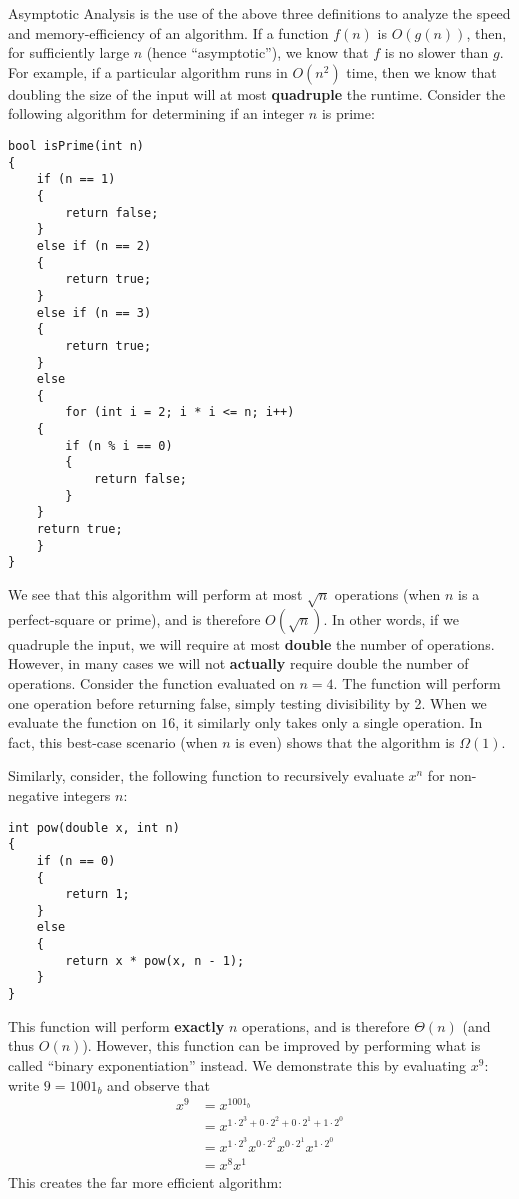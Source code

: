 \documentclass[a4paper]{article}
\begin{document}
Asymptotic Analysis is the use of the above three definitions to analyze the speed and memory-efficiency of an algorithm. If a function $f(n)$ is $O(g(n))$, then, for sufficiently large $n$ (hence ``asymptotic''), we know that $f$ is no slower than $g$. For example, if a particular algorithm runs in $O(n^2)$ time, then we know that doubling the size of the input will at most \textbf{quadruple} the runtime. Consider the following algorithm for determining if an integer $n$ is prime:

\begin{verbatim}
bool isPrime(int n)
{
    if (n == 1)
    {
        return false;
    }
    else if (n == 2)
    {
        return true;
    }
    else if (n == 3)
    {
        return true;
    }
    else
    {
        for (int i = 2; i * i <= n; i++)
    {
        if (n % i == 0)
        {
            return false;
        }
    }
    return true;
    }
}
\end{verbatim}

We see that this algorithm will perform at most $\sqrt{n}$ operations (when $n$ is a perfect-square or prime), and is therefore $O(\sqrt{n})$. In other words, if we quadruple the input, we will require at most \textbf{double} the number of operations. However, in many cases we will not \textbf{actually} require double the number of operations. Consider the function evaluated on $n=4$. The function will perform one operation before returning false, simply testing divisibility by 2. When we evaluate the function on $16$, it similarly only takes only a single operation. In fact, this best-case scenario (when $n$ is even) shows that the algorithm is $\Omega(1)$. 

Similarly, consider, the following function to recursively evaluate $x^n$ for non-negative integers $n$:
\begin{verbatim}
int pow(double x, int n)
{
	if (n == 0)
	{
		return 1;
	}
	else
	{
		return x * pow(x, n - 1);
	}
}
\end{verbatim}

This function will perform \textbf{exactly} $n$ operations, and is therefore $\Theta(n)$ (and thus $O(n)$). However, this function can be improved by performing what is called ``binary exponentiation'' instead. We demonstrate this by evaluating $x^9$: write $9=1001_b$ and observe that\begin{align*}x^9&=x^{1001_b}\\&=x^{1\cdot2^3+0\cdot2^2+0\cdot2^1+1\cdot2^0}\\&=x^{1\cdot2^3}x^{0\cdot2^2}x^{0\cdot2^1}x^{1\cdot2^0}\\&=x^8x^1\end{align*} This creates the far more efficient algorithm:
\end{document}
